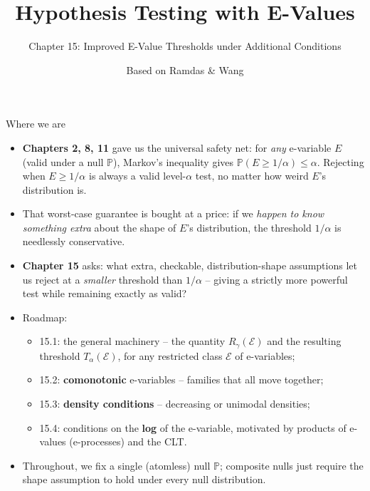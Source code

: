 \documentclass[aspectratio=169,10pt]{beamer}
\title[E-Values -- Ch.15]{Hypothesis Testing with E-Values}
\subtitle{Chapter 15: Improved E-Value Thresholds under Additional Conditions}
\author{Based on Ramdas \& Wang}
\date{}
\newcommand{\PP}{\mathbb{P}}
\newcommand{\calE}{\mathcal{E}}
\begin{document}
\begin{frame}
  \titlepage
\end{frame}

\begin{frame}{Where we are}
  \begin{itemize}
    \item \textbf{Chapters 2, 8, 11} gave us the universal safety net: for \emph{any} e-variable $E$ (valid under a null $\PP$), Markov's inequality gives $\PP(E\ge 1/\alpha)\le\alpha$. Rejecting when $E\ge 1/\alpha$ is always a valid level-$\alpha$ test, no matter how weird $E$'s distribution is.
    \item That worst-case guarantee is bought at a price: if we \emph{happen to know something extra} about the shape of $E$'s distribution, the threshold $1/\alpha$ is needlessly conservative.
    \item \textbf{Chapter 15} asks: what extra, checkable, distribution-shape assumptions let us reject at a \emph{smaller} threshold than $1/\alpha$ -- giving a strictly more powerful test while remaining exactly as valid?
    \item Roadmap:
    \begin{itemize}
      \item 15.1: the general machinery -- the quantity $R_\gamma(\calE)$ and the resulting threshold $T_\alpha(\calE)$, for any restricted class $\calE$ of e-variables;
      \item 15.2: \textbf{comonotonic} e-variables -- families that all move together;
      \item 15.3: \textbf{density conditions} -- decreasing or unimodal densities;
      \item 15.4: conditions on the \textbf{log} of the e-variable, motivated by products of e-values (e-processes) and the CLT.
    \end{itemize}
    \item Throughout, we fix a single (atomless) null $\PP$; composite nulls just require the shape assumption to hold under every null distribution.
  \end{itemize}
\end{frame}
\end{document}
